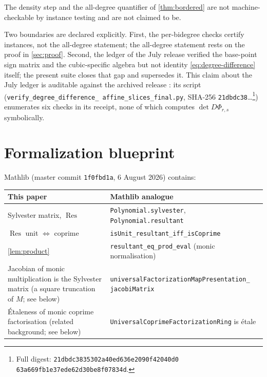 \documentclass[11pt,reqno]{amsart}
\theoremstyle{definition}
\theoremstyle{remark}
\newcommand{\Res}{\operatorname{Res}}
\begin{document}
The density step and the all-degree quantifier of
\cref{thm:bordered} are not machine-checkable by instance testing and
are not claimed to be.

Two boundaries are declared explicitly.  First, the per-bidegree
checks certify instances, not the all-degree statement; the
all-degree statement rests on the proof in \cref{sec:proof}.  Second,
the ledger of the July release verified the base-point sign matrix
and the cubic-specific algebra but not identity
\eqref{eq:degree-difference} itself; the present suite closes that
gap and supersedes it.  This claim about the July ledger is auditable
against the archived release \cite{DDAS}: its script
(\texttt{verify\_\allowbreak degree\_\allowbreak difference\_\allowbreak
affine\_\allowbreak slices\_\allowbreak final.py}, SHA-256
\texttt{21dbdc38}\dots\footnote{Full digest:
\texttt{21dbdc3835302a40ed636e2090f42040d0\allowbreak
63a669fb1e37ede62d30be8f07834d}.})
enumerates six checks in its receipt, none of which computes
$\det D\Phi_{r,s}$ symbolically.

\section{Formalization blueprint}\label{sec:blueprint}

Mathlib (master commit \texttt{1f0fbd1a}, 6 August 2026) contains:

\begin{center}
\small
\begin{tabular}{@{}p{2.35in}p{3.35in}@{}}
\toprule
This paper & Mathlib analogue \\
\midrule
Sylvester matrix, $\Res$ &
\texttt{Polynomial.sylvester}, \texttt{Polynomial.resultant}
\cite{MathlibResultant} \\
$\Res$ unit $\Leftrightarrow$ coprime &
\texttt{isUnit\_resultant\_iff\_isCoprime} \\
\cref{lem:product} &
\texttt{resultant\_eq\_prod\_eval} (monic normalisation) \\
Jacobian of monic multiplication is the Sylvester matrix (a square
truncation of $M$; see below) &
\texttt{universalFactorizationMapPresentation\_}\newline
\texttt{jacobiMatrix}
\cite{MathlibUFR} \\
\'Etaleness of monic coprime factorisation (related background; see
below) &
\texttt{UniversalCoprimeFactorizationRing} is \'etale
\cite{MathlibUFR} \\
\bottomrule
\end{tabular}
\end{center}
\end{document}
